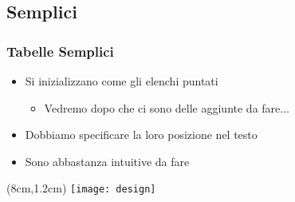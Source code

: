 \subsection{Semplici}
\begin{frame}

  \frametitle{Tabelle Semplici}
  
  \begin{itemize}
   \item Si inizializzano come gli elenchi puntati
   \begin{itemize}
    \item Vedremo dopo che ci sono delle aggiunte da fare...
   \end{itemize}
   \item Dobbiamo specificare la loro posizione nel testo
   \item Sono abbastanza intuitive da fare
  \end{itemize}
  
  \begin{textblock*}{5cm}(8cm,1.2cm)
   \texttt{[image: design]}
  \end{textblock*}

\end{frame}
